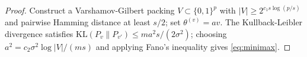 \documentclass[10pt,a4paper]{amsart}
\begin{document}
\begin{proof}
Construct a Varshamov-Gilbert packing $V\subset\{0,1\}^p$ with $|V|\ge2^{c_1s\log(p/s)}$
and pairwise Hamming distance at least $s/2$; set $\theta^{(v)}=av$.
The Kullback-Leibler divergence satisfies
$\mathrm{KL}(P_v\|P_{v'})\le ma^2s/(2\sigma^2)$; choosing
$a^2=c_2\sigma^2\log|V|/(ms)$ and applying Fano's inequality gives \eqref{eq:minimax}.
\end{proof}
\end{document}
